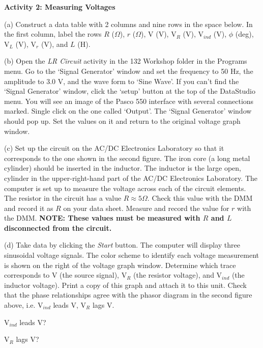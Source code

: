 \textbf{Activity 2: Measuring Voltages} 

(a) Construct a data table with 2 columns and nine rows in the space
below. In the first column, label the rows $R$ (\( \Omega  \)), $r$ (\( \Omega  \)), V (V),
V\( _{R} \) (V), V\( _{ind} \) (V), \( \phi  \) (deg), V\( _{L} \)
(V), V\( _{r} \) (V), and $L$ (H).
\answerspace{3.5in}

(b) Open the \emph{LR Circuit} activity
in the 132 Workshop folder in the Programs menu. 
Go to the `Signal Generator' window and set the frequency to 50 Hz, the amplitude 
to 3.0 V, and the wave form to `Sine Wave'.
If you can't find the `Signal Generator' window, click the `setup' button at
the top of the DataStudio menu.
You will see an image of the Pasco 550 interface with several
connections marked.
Single click on the one called `Output'.
The `Signal Generator' window should pop up. 
Set the values on it and return to the original voltage graph window.

\pagebreak[3]
(c) Set up the circuit on the AC/DC Electronics Laboratory so that it corresponds to the one shown in the second figure. The iron core (a long metal cylinder) should be inserted in the inductor. The inductor is the large open, cylinder in the upper-right-hand part of the AC/DC Electronics Laboratory.
The computer is set up to measure the voltage
across each of the circuit elements. The resistor in the circuit 
has a value $R\approx 5\Omega$. Check this value with the DMM and record it
as $R$ on your data sheet. Measure and record the value for $r$ with the DMM.
\textbf{NOTE: These values must be measured with $R$ and $L$ disconnected from the circuit.}

(d) Take data by clicking the \emph{Start} button. The computer will display three sinusoidal
voltage signals. The color scheme to identify each voltage measurement
is shown on the right of the voltage graph window. Determine which trace
corresponds to V (the source signal), V\( _{R} \) (the resistor voltage), and V\( _{ind} \) (the inductor voltage). 
Print a copy of this graph and attach it to this unit.
Check that the phase relationships agree with
the phasor diagram in the second figure above, i.e. V\( _{ind} \) leads V, V\( _{R} \) lags V.
\vspace{5.0mm}

\hspace{2.0in} V\( _{ind} \) leads V?
\vspace{5.0mm}

\hspace{2.0in} V\( _{R} \) lags V?
\vspace{5.0mm}

